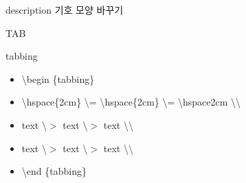 \documentclass[ aspectratio=149,  10pt,blue,xcolor=pdftex,dvipsnames,table,handout,notes]{beamer}
\begin{document}
		\begin{frame}[t]{description 기호 모양 바꾸기}

		\end{frame}




		\begin{frame}[t]{TAB}

		\begin{block}{tabbing}
		\begin{itemize}
		\item[]	\textbackslash begin \{tabbing\}
		\item[]	\textbackslash hspace\{2cm\}	\textbackslash = 
				\textbackslash hspace\{2cm\}	\textbackslash = 
				\textbackslash hspace{2cm}	
				\textbackslash \textbackslash 

		\item[]	text	\textbackslash $>$
				text	\textbackslash $>$
				text	\textbackslash\textbackslash

		\item[]	text	\textbackslash $>$
				text	\textbackslash $>$
				text	\textbackslash\textbackslash

		\item[]	\textbackslash end \{tabbing\}
		\end{itemize}

		\end{block}


		\end{frame}
\end{document}
